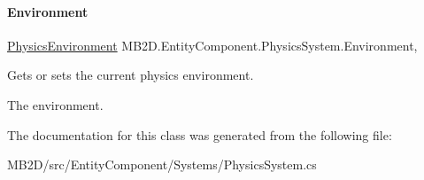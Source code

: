 \paragraph{\texorpdfstring{Environment}{Environment}}
{\footnotesize\ttfamily \hyperlink{class_m_b2_d_1_1_entity_component_1_1_physics_environment}{Physics\+Environment} M\+B2\+D.\+Entity\+Component.\+Physics\+System.\+Environment\hspace{0.3cm}{\ttfamily [get]}, {\ttfamily [set]}}



Gets or sets the current physics environment. 

The environment.

The documentation for this class was generated from the following file\+:\begin{DoxyCompactItemize}
\item 
M\+B2\+D/src/\+Entity\+Component/\+Systems/Physics\+System.\+cs\end{DoxyCompactItemize}
